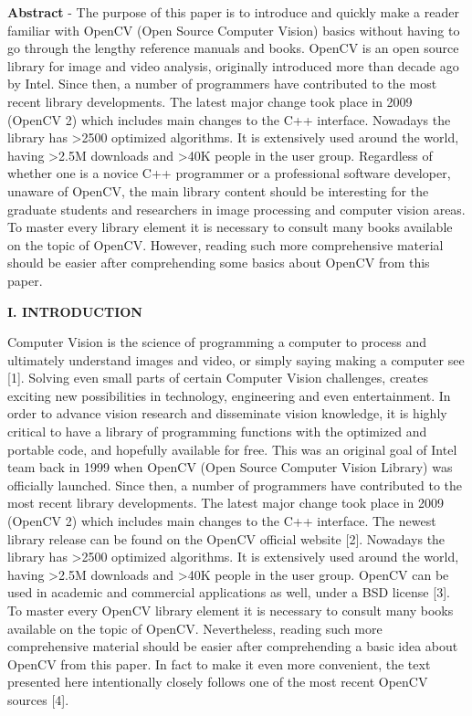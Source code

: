 \documentclass{bjtu-bachelor-thesis}
\begin{document}
\begin{appendices}
\textbf{Abstract} - The purpose of this paper is to introduce and quickly make a reader familiar with OpenCV (Open Source Computer Vision) basics without having to go through the lengthy reference manuals and books. OpenCV is an open source library for image and video analysis, originally introduced more than decade ago by Intel. Since then, a number of programmers have contributed to the most recent library developments. The latest major change took place in 2009 (OpenCV 2) which includes main changes to the C++ interface. Nowadays the library has >2500 optimized algorithms. It is extensively used around the world, having >2.5M downloads and >40K people in the user group. Regardless of whether one is a novice C++ programmer or a professional software developer, unaware of OpenCV, the main library content should be interesting for the graduate students and researchers in image processing and computer vision areas. To master every library element it is necessary to consult many books available on the topic of OpenCV. However, reading such more comprehensive material should be easier after comprehending some basics about OpenCV from this paper. \par
\textbf{I. INTRODUCTION} \par
Computer Vision is the science of programming a computer to process and ultimately understand images and video, or simply saying making a computer see {[}1{]}. Solving even small parts of certain Computer Vision challenges, creates exciting new possibilities in technology, engineering and even entertainment. In order to advance vision research and disseminate vision knowledge, it is highly critical to have a library of programming functions with the optimized and portable code, and hopefully available for free. This was an original goal of Intel team back in 1999 when OpenCV (Open Source Computer Vision Library) was officially launched. Since then, a number of programmers have contributed to the most recent library developments. The latest major change took place in 2009 (OpenCV 2) which includes main changes to the C++ interface. The newest library release can be found on the OpenCV official website {[}2{]}. Nowadays the library has >2500 optimized algorithms. It is extensively used around the world, having >2.5M downloads and >40K people in the user group. OpenCV can be used in academic and commercial applications as well, under a BSD license {[}3{]}. To master every OpenCV library element it is necessary to consult many books available on the topic of OpenCV. Nevertheless, reading such more comprehensive material should be easier after comprehending a basic idea about OpenCV from this paper. In fact to make it even more convenient, the text presented here intentionally closely follows one of the most recent OpenCV sources {[}4{]}. \par

\end{appendices}
\end{document}
